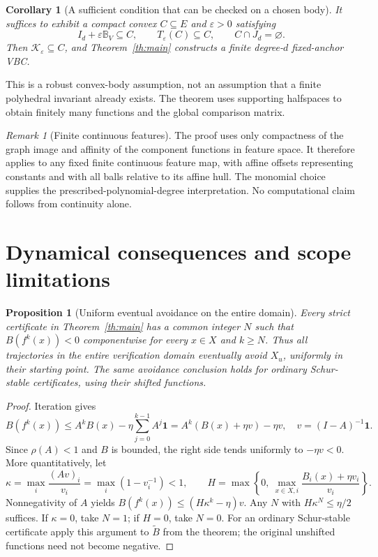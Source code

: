 \documentclass[10pt,letterpaper]{article}
\newtheorem{proposition}{Proposition}
\newtheorem{corollary}{Corollary}
\theoremstyle{remark}
\newtheorem*{remark}{Remark}
\newcommand{\one}{\mathbf 1}
\newcommand{\ball}{\mathbb B_V}
\begin{document}
\begin{corollary}[A sufficient condition that can be checked on a chosen body]\label{cor:body}
It suffices to exhibit a compact convex $C\subseteq E$ and $\varepsilon>0$ satisfying
\[
 I_d+\varepsilon\ball\subseteq C,\qquad
 T_\varepsilon(C)\subseteq C,\qquad C\cap J_d=\varnothing.
\]
Then $\mathcal K_\varepsilon\subseteq C$, and Theorem~\ref{th:main} constructs a finite degree-$d$ fixed-anchor VBC.
\end{corollary}
This is a robust convex-body assumption, not an assumption that a finite polyhedral invariant already exists. The theorem uses supporting halfspaces to obtain finitely many functions and the global comparison matrix.

\begin{remark}[Finite continuous features]
The proof uses only compactness of the graph image and affinity of the component functions in feature space. It therefore applies to any fixed finite continuous feature map, with affine offsets representing constants and with all balls relative to its affine hull. The monomial choice supplies the prescribed-polynomial-degree interpretation. No computational claim follows from continuity alone.
\end{remark}

\section{Dynamical consequences and scope limitations}\label{sec:limitation}
\begin{proposition}[Uniform eventual avoidance on the entire domain]\label{prop:absorb}
Every strict certificate in Theorem~\ref{th:main} has a common integer $N$ such that $B(f^k(x))<0$ componentwise for every $x\in X$ and $k\geq N$. Thus all trajectories in the entire verification domain eventually avoid $X_u$, uniformly in their starting point. The same avoidance conclusion holds for ordinary Schur-stable certificates, using their shifted functions.
\end{proposition}
\begin{proof}
Iteration gives
\[
 B(f^k(x))\leq A^kB(x)-\eta\sum_{j=0}^{k-1}A^j\one
 =A^k(B(x)+\eta v)-\eta v,\quad v=(I-A)^{-1}\one.
\]
Since $\rho(A)<1$ and $B$ is bounded, the right side tends uniformly to $-\eta v<0$. More quantitatively, let
\[
 \kappa=\max_i\frac{(Av)_i}{v_i}=\max_i(1-v_i^{-1})<1,\qquad
 H=\max\left\{0,\ \max_{x\in X,i}\frac{B_i(x)+\eta v_i}{v_i}\right\}.
\]
Nonnegativity of $A$ yields $B(f^k(x))\leq(H\kappa^k-\eta)v$. Any $N$ with $H\kappa^N\leq\eta/2$ suffices. If $\kappa=0$, take $N=1$; if $H=0$, take $N=0$. For an ordinary Schur-stable certificate apply this argument to $\widetilde B$ from the theorem; the original unshifted functions need not become negative.
\end{proof}
\end{document}

